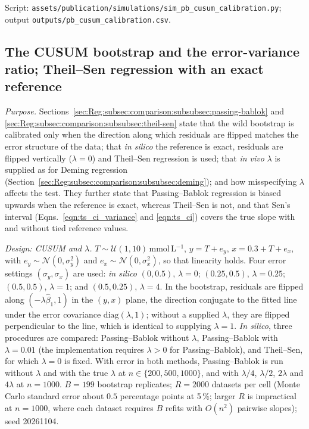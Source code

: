 \noindent Script: \texttt{assets/publication/simulations/sim\_pb\_cusum\_calibration.py}; output \texttt{outputs/pb\_cusum\_calibration.csv}.

\subsection{The CUSUM bootstrap and the error-variance ratio; Theil--Sen regression with an exact reference}
\label{supp:sim:cusum_lambda}

\textit{Purpose.} Sections~\ref{sec:Reg:subsec:comparison:subsubsec:passing-bablok} and \ref{sec:Reg:subsec:comparison:subsubsec:theil-sen} state that the wild bootstrap is calibrated only when the direction along which residuals are flipped matches the error structure of the data; that \textit{in silico} the reference is exact, residuals are flipped vertically ($\lambda = 0$) and Theil--Sen regression is used; that \textit{in vivo} $\lambda$ is supplied as for Deming regression (Section~\ref{sec:Reg:subsec:comparison:subsubsec:deming}); and how misspecifying $\lambda$ affects the test. They further state that Passing--Bablok regression is biased upwards when the reference is exact, whereas Theil--Sen is not, and that Sen's interval (Eqns.~\ref{eqn:ts_ci_variance} and \ref{eqn:ts_ci}) covers the true slope with and without tied reference values.

\textit{Design: CUSUM and $\lambda$.} $T \sim \mathcal{U}(1, 10)$\,mmol\,L$^{-1}$, $y = T + e_y$, $x = 0.3 + T + e_x$, with $e_y \sim \mathcal{N}(0, \sigma_y^2)$ and $e_x \sim \mathcal{N}(0, \sigma_x^2)$, so that linearity holds. Four error settings $(\sigma_y, \sigma_x)$ are used: \textit{in silico} $(0, 0.5)$, $\lambda = 0$; $(0.25, 0.5)$, $\lambda = 0.25$; $(0.5, 0.5)$, $\lambda = 1$; and $(0.5, 0.25)$, $\lambda = 4$. In the bootstrap, residuals are flipped along $(-\lambda\hat\beta_1, 1)$ in the $(y, x)$ plane, the direction conjugate to the fitted line under the error covariance $\mathrm{diag}(\lambda, 1)$; without a supplied $\lambda$, they are flipped perpendicular to the line, which is identical to supplying $\lambda = 1$. \textit{In silico}, three procedures are compared: Passing--Bablok without $\lambda$, Passing--Bablok with $\lambda = 0.01$ (the implementation requires $\lambda > 0$ for Passing--Bablok), and Theil--Sen, for which $\lambda = 0$ is fixed. With error in both methods, Passing--Bablok is run without $\lambda$ and with the true $\lambda$ at $n \in \{200, 500, 1000\}$, and with $\lambda/4$, $\lambda/2$, $2\lambda$ and $4\lambda$ at $n = 1000$. $B = 199$ bootstrap replicates; $R = 2000$ datasets per cell (Monte Carlo standard error about $0.5$ percentage points at 5\,\%; larger $R$ is impractical at $n = 1000$, where each dataset requires $B$ refits with $O(n^2)$ pairwise slopes); seed 20261104.

